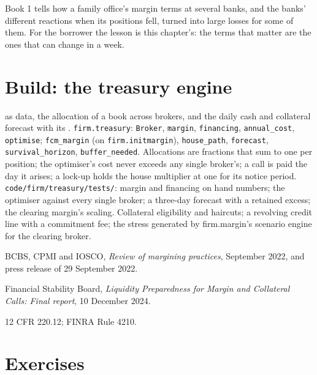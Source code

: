 Book 1 tells how a family office's margin terms at several banks, and the banks' different reactions when its positions fell, turned into
large losses for some of them. For the borrower the lesson is this chapter's: the terms that matter are the ones that can change
in a week.

\section{Build: the treasury engine}\label{bld:fm:treasury-and-funding:treasury}

\begin{build}
  as data, the allocation of a book across brokers, and the daily cash and collateral forecast with its .
 \texttt{firm.treasury}: \texttt{Broker}, \texttt{margin}, \texttt{financing}, \texttt{annual\_cost}, \texttt{optimise};
\texttt{fcm\_margin} (on \texttt{firm.initmargin}), \texttt{house\_path}, \texttt{forecast}, \texttt{survival\_horizon}, \texttt{buffer\_needed}.
 Allocations are fractions that sum to one per position; the optimiser's cost never exceeds any single broker's; a call is paid the
day it arises; a lock-up holds the house multiplier at one for its notice period.
 \texttt{code/firm/treasury/tests/}: margin and financing on hand numbers; the optimiser against every single broker; a
three-day forecast with a retained excess; the clearing margin's scaling.
 Collateral eligibility and haircuts; a revolving credit line with a commitment fee; the stress generated by firm.margin's scenario
engine for the clearing broker.
\end{build}

\begin{omsources}
\item BCBS, CPMI and IOSCO, \emph{Review of margining practices}, September 2022, and press release of 29 September 2022.
\item Financial Stability Board, \emph{Liquidity Preparedness for Margin and Collateral Calls: Final report}, 10 December 2024.
\item 12 CFR 220.12; FINRA Rule 4210.
\end{omsources}

\section{Exercises}

